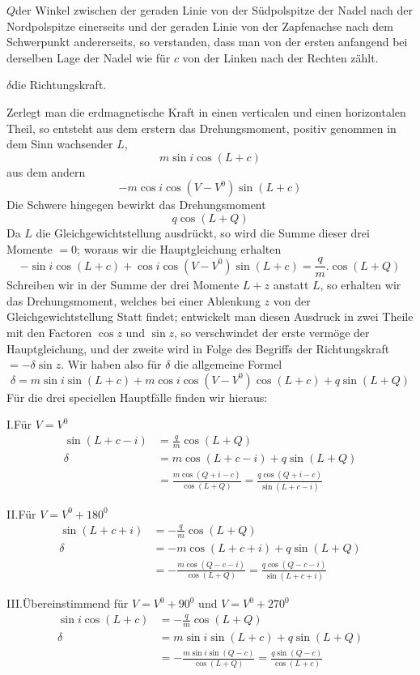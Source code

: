 $Q$\quad der Winkel zwischen der geraden Linie von der Südpolspitze der Nadel nach der Nordpolspitze einerseits und der geraden Linie von der Zapfenachse nach dem Schwerpunkt andererseits, so verstanden, dass man von der ersten anfangend bei derselben Lage der Nadel wie für $c$ von der Linken nach der Rechten zählt.

$\delta$\quad die Richtungskraft.

Zerlegt man die erdmagnetische Kraft in einen verticalen und einen horizontalen Theil, so entsteht aus dem erstern das Drehungsmoment, positiv genommen in dem Sinn wachsender $L$,
\[
m\sin i\cos(L+c)
\]
aus dem andern
\[
-m\cos i\cos(V-V^0)\sin(L+c)
\]
Die Schwere hingegen bewirkt das Drehungsmoment
\[
q\cos(L+Q)
\]
Da $L$ die Gleichgewichtstellung ausdrückt, so wird die Summe dieser drei Momente $=0$; woraus wir die Hauptgleichung erhalten
\[
-\sin i\cos(L+c)+\cos i\cos(V-V^0)\sin(L+c)=\frac{q}{m}.\cos(L+Q)
\]
Schreiben wir in der Summe der drei Momente $L+z$ anstatt $L$, so erhalten wir das Drehungsmoment, welches bei einer Ablenkung $z$ von der Gleichgewichtstellung Statt findet; entwickelt man diesen Ausdruck in zwei Theile mit den Factoren $\cos z$ und $\sin z$, so verschwindet der erste vermöge der Hauptgleichung, und der zweite wird in Folge des Begriffs der Richtungskraft $=-\delta\sin z$.
Wir haben also für $\delta$ die allgemeine Formel
\[
\delta=m\sin i\sin(L+c)+m\cos i\cos(V-V^0)\cos(L+c)+q\sin(L+Q)
\]
Für die drei speciellen Hauptfälle finden wir hieraus:

I.\quad Für $V=V^0$
\[
\begin{aligned}
\sin(L+c-i)&=\frac{q}{m}\cos(L+Q)\\
\delta&=m\cos(L+c-i)+q\sin(L+Q)\\
&=\frac{m\cos(Q+i-c)}{\cos(L+Q)}=\frac{q\cos(Q+i-c)}{\sin(L+c-i)}
\end{aligned}
\]

II.\quad Für $V=V^0+180^0$
\[
\begin{aligned}
\sin(L+c+i)&=-\frac{q}{m}\cos(L+Q)\\
\delta&=-m\cos(L+c+i)+q\sin(L+Q)\\
&=-\frac{m\cos(Q-c-i)}{\cos(L+Q)}=\frac{q\cos(Q-c-i)}{\sin(L+c+i)}
\end{aligned}
\]

III.\quad Übereinstimmend für $V=V^0+90^0$ und $V=V^0+270^0$
\[
\begin{aligned}
\sin i\cos(L+c)&=-\frac{q}{m}\cos(L+Q)\\
\delta&=m\sin i\sin(L+c)+q\sin(L+Q)\\
&=-\frac{m\sin i\sin(Q-c)}{\cos(L+Q)}=\frac{q\sin(Q-c)}{\cos(L+c)}
\end{aligned}
\]

